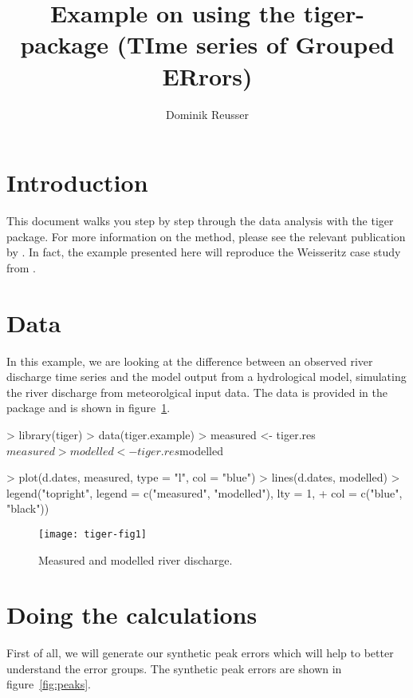 \documentclass[a4paper]{article}
\begin{document}
\title{Example on using the tiger-package (TIme series of Grouped
ERrors)}
\author{Dominik Reusser}
\maketitle
\section{Introduction}
This document walks you step by step through the data analysis with
the tiger package. For more information on the method, please see
the relevant publication by \citet{Reusser2008a}.
In fact, the example presented here will reproduce the Weisseritz case
study from \citep{Reusser2008a}.

\section{Data}
In this example, we are looking at the difference between an observed
river discharge time series and the model output from a hydrological
model, simulating the river discharge from meteorolgical input data.
The data is provided in the package and is shown in
figure~\ref{fig:data}.

\begin{Schunk}
\begin{Sinput}
> library(tiger)
> data(tiger.example)
> measured <- tiger.res$measured
> modelled <- tiger.res$modelled
\end{Sinput}
\end{Schunk}


\begin{Schunk}
\begin{Sinput}
> plot(d.dates, measured, type = "l", col = "blue")
> lines(d.dates, modelled)
> legend("topright", legend = c("measured", "modelled"), lty = 1, 
+     col = c("blue", "black"))
\end{Sinput}
\end{Schunk}

\begin{figure}
\begin{center}
\texttt{[image: tiger-fig1]}
\end{center}
\caption{Measured and modelled river discharge.}
\label{fig:data}
\end{figure}

\section{Doing the calculations}
First of all, we will generate our synthetic peak errors which will
help to better understand the error groups. The synthetic peak errors
are shown in figure~\ref{fig:peaks}.
\end{document}
